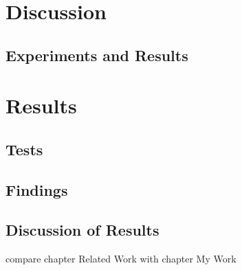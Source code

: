 \documentclass{report}
\begin{document}
\chapter{Discussion}


\section{Experiments and Results}


\chapter{Results}
\section{Tests}
\section{Findings}
\section{Discussion of Results}
compare chapter Related Work with chapter My Work \cite{LifschitzASP}
\end{document}
